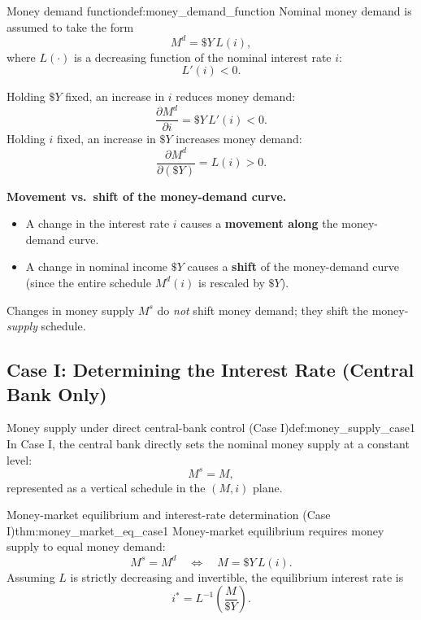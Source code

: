 \begin{definition}{Money demand function}{def:money_demand_function}
Nominal money demand is assumed to take the form
\[
M^d = \$Y \, L(i),
\]
where $L(\cdot)$ is a decreasing function of the nominal interest rate $i$:
\[
L'(i) < 0.
\]
\end{definition}

\begin{keyformula}[title={Key Formula: Comparative statics of money demand}]
Holding $\$Y$ fixed, an increase in $i$ reduces money demand:
\[
\frac{\partial M^d}{\partial i} = \$Y\,L'(i) < 0.
\]
Holding $i$ fixed, an increase in $\$Y$ increases money demand:
\[
\frac{\partial M^d}{\partial (\$Y)} = L(i) > 0.
\]
\end{keyformula}

\begin{commonmistake}
\textbf{Movement vs.\ shift of the money-demand curve.}
\begin{itemize}
  \item A change in the interest rate $i$ causes a \textbf{movement along} the money-demand curve.
  \item A change in nominal income $\$Y$ causes a \textbf{shift} of the money-demand curve (since the entire schedule $M^d(i)$ is rescaled by $\$Y$).
\end{itemize}
Changes in money supply $M^s$ do \emph{not} shift money demand; they shift the money-\emph{supply} schedule.
\end{commonmistake}

\subsection{Case I: Determining the Interest Rate (Central Bank Only)}

\begin{definition}{Money supply under direct central-bank control (Case I)}{def:money_supply_case1}
In Case I, the central bank directly sets the nominal money supply at a constant level:
\[
M^s = M,
\]
represented as a vertical schedule in the $(M,i)$ plane.
\end{definition}

\begin{theorem}{Money-market equilibrium and interest-rate determination (Case I)}{thm:money_market_eq_case1}
Money-market equilibrium requires money supply to equal money demand:
\[
M^s = M^d
\quad\Longleftrightarrow\quad
M = \$Y\,L(i).
\]
Assuming $L$ is strictly decreasing and invertible, the equilibrium interest rate is
\[
i^\ast = L^{-1}\!\left(\frac{M}{\$Y}\right).
\]
\end{theorem}

